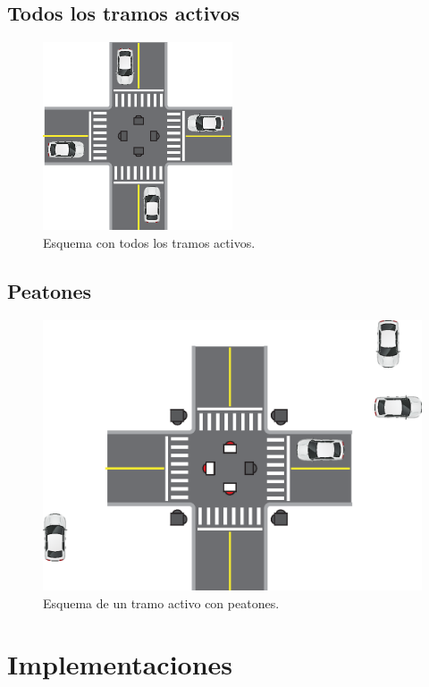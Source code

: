 \subsection{Todos los tramos activos}
\begin{figure}[htbp]
	\centering
	\includegraphics[width=0.5\textwidth]{diagramas/todos-activos.eps}
	\caption{Esquema con todos los tramos activos.}
	\label{fig:todos-activos}
\end{figure}

\subsection{Peatones}
\begin{figure}[htbp]
	\centering
	\includegraphics[width=1\textwidth]{diagramas/peaton-auto.eps}
	\caption{Esquema de un tramo activo con peatones.}
	\label{fig:peaton-auto}
\end{figure}

\section{Implementaciones}

